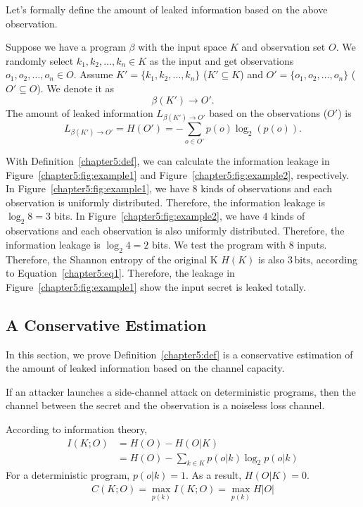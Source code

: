 Let's formally define the amount of leaked information based on the above observation.

\begin{mydef}
  \label{chapter5:def}
    Suppose we have a program $\beta$ with the input space $K$ and observation set $O$. We randomly select $k_1, k_2, \ldots, k_n \in K$ as the input and get observations $o_1, o_2, \ldots, o_n \in O$. Assume $K'=\{k_1, k_2, \ldots, k_n\}$  ($K' \subseteq K$) and
    $O'=\{o_1, o_2, \ldots, o_n\}$  ($O' \subseteq O$).
    We denote it as
    $$\beta(K') \rightarrow	O'.$$
    The amount of leaked information $L_{\beta(K')\rightarrow O'}$ based on the observations ($O'$) is
    $$L_{\beta(K')\rightarrow O'} = H(O') = - \sum_{o {\in} O'}p(o)\log_2(p(o)). $$
\end{mydef}


With Definition~\ref{chapter5:def}, we can calculate the information leakage in Figure~\ref{chapter5:fig:example1} and Figure~\ref{chapter5:fig:example2}, respectively. In Figure~\ref{chapter5:fig:example1}, we have $8$ kinds of observations and each observation is uniformly distributed. Therefore, the information leakage is $\log_2{8} = 3$ bits. In Figure~\ref{chapter5:fig:example2}, we have $4$ kinds of observations and each observation is also uniformly distributed. Therefore, the information leakage is $\log_2{4} = 2$ bits. We test the program with $8$ inputs. Therefore, the Shannon entropy of the original K $H(K)$ is also $3\,\mathrm{bits}$, according to Equation~\ref{chapter5:eq1}. Therefore, the leakage in Figure~\ref{chapter5:fig:example1} show the input secret is leaked totally.

\subsection{A Conservative Estimation}
In this section, we prove Definition~\ref{chapter5:def} is a conservative estimation of the amount of leaked information based on the channel capacity.

\begin{theorem}\label{the1}
  If an attacker launches a side-channel attack on deterministic programs, then the channel between the secret and the observation is a noiseless loss channel.
\end{theorem}

\begin{myprof}
  According to information theory,
  \begin{align*}
    I(K;O) & = H(O) - H(O|K)                                \\
           & = H(O) - \sum_{k {\in} K }{p(o|k)\log_2p(o|k)}
  \end{align*}
  For a deterministic program, $p(o|k)=1$. As a result, $H(O|K) = 0$.
  \begin{align*}
    C(K;O) = \max_{p(k)} I(K;O) = \max_{p(k)} H |O|
  \end{align*}
\end{myprof}

